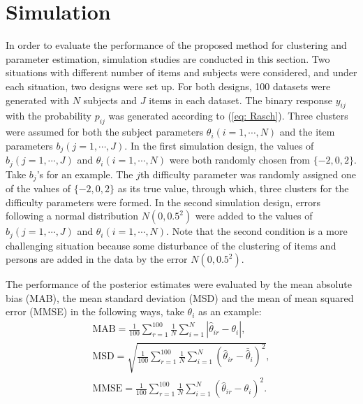 \documentclass[12pt]{article}
\begin{document}
\section{Simulation}\label{sec:simu}
In order to evaluate the performance of the proposed method for clustering and parameter estimation,  simulation studies are conducted in this section. Two situations with different number of items and subjects were considered, and under each situation, two designs were set up.  For both designs, 100 datasets were generated with $N$ subjects and $J$ items in each dataset. The binary response $y_{ij}$ with the probability $p_{ij}$ was generated according to (\ref{eq: Rasch}). Three clusters were assumed for both the subject parameters $\theta_i (i = 1,\cdots,N)$ and the item parameters $b_j (j=1,\cdots, J)$. 
In the first simulation design, the values of $b_j (j = 1, \cdots, J)$ and $\theta_i (i = 1, \cdots, N)$ were both randomly chosen from $\{ -2, 0, 2\}$. Take $b_j$'s for an example. The $j$th difficulty parameter was randomly assigned one of the values of $\{-2,0,2\}$ as its true value, through which, three clusters for the difficulty parameters were formed. In the second simulation design, errors following a normal distribution $N(0, 0.5^2)$ were added to the values of $b_j (j = 1, \cdots, J)$ and $\theta_i (i = 1, \cdots, N)$. Note that the second condition is a more challenging situation because some disturbance of the clustering of items and persons are added in the data by the error $N(0, 0.5^2)$.

The performance of the posterior estimates were evaluated by the mean absolute bias (MAB), the mean standard deviation (MSD) and the mean of mean squared error (MMSE) %
in the
following ways, take $\theta_i$ as an example:
\begin{gather*}
\text{MAB} = \frac{1}{100} \sum_{r=1}^{100}\frac{1}{N} \sum_{i=1}^{N}
\left|\hat{\theta}_{ir} - \theta_{i} \right|, \\
\text{MSD} = 
\sqrt{\frac{1}{100}
	\sum_{r=1}^{100} \frac{1}{N} \sum_{i=1}^{N}\left(\hat{\theta}_{ir} - \bar{\hat{\theta}}_{i}
	\right)^2},\\
\text{MMSE} =  \frac{1}{100}
\sum_{r=1}^{100}
\frac{1}{N} \sum_{i=1}^{N} \left(\hat{\theta}_{ir} - \theta_{i} \right)^2.
\end{gather*}
\end{document}
